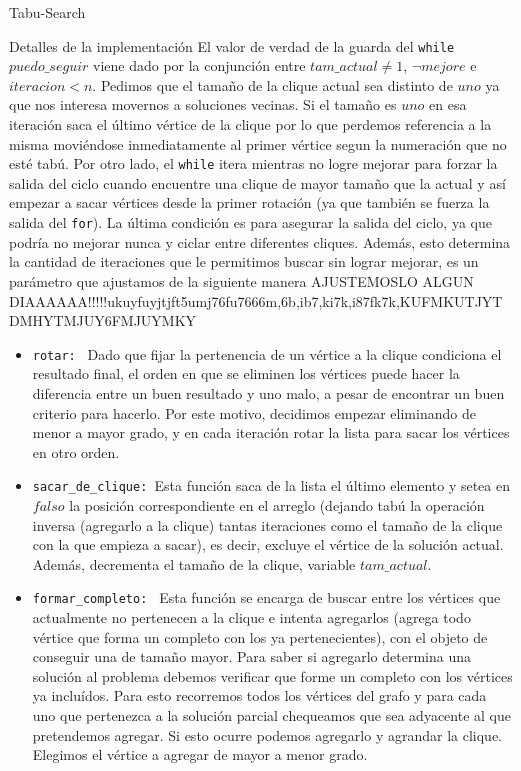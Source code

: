 \begin{section}{Tabu-Search}
\begin{subsection}{Detalles de la implementación}
		El valor de verdad de la guarda del \texttt{while} $puedo\_seguir$ viene dado por la conjunción entre $tam\_actual \neq 1$, $\neg mejore$ e $iteracion<n$.
		Pedimos que el tamaño de la clique actual sea distinto de $uno$ ya que nos interesa movernos a soluciones vecinas. Si el tamaño es $uno$ en esa iteración saca el último vértice de la clique por lo que perdemos referencia a la misma moviéndose inmediatamente al primer vértice segun la numeración que no esté tabú.
		Por otro lado, el \texttt{while} itera mientras no logre mejorar para forzar la salida del ciclo cuando encuentre una clique de mayor tamaño que la actual y así empezar a sacar vértices desde la primer rotación (ya que también se fuerza la salida del \texttt{for}).
		La última condición es para asegurar la salida del ciclo, ya que podría no mejorar nunca y ciclar entre diferentes cliques. Además, esto determina la cantidad de iteraciones que le permitimos buscar sin lograr mejorar, es un parámetro que ajustamos de la siguiente manera AJUSTEMOSLO ALGUN DIAAAAAA!!!!!ukuyfuyjtjft5umj76fu7666m,6b,ib7,ki7k,i87fk7k,KUFMKUTJYTDMHYTMJUY6FMJUYMKY

		\begin{itemize}			
			\item \texttt{rotar: } Dado que fijar la pertenencia de un vértice a la clique condiciona el resultado final, el orden en que se eliminen los vértices puede hacer la diferencia entre un buen resultado y uno malo, a pesar de encontrar un buen criterio para hacerlo. Por este motivo, decidimos empezar eliminando de menor a mayor grado, y en cada iteración rotar la lista para sacar los vértices en otro orden.
			
			\item \texttt{sacar\_de\_clique: }Esta función saca de la lista el último elemento y setea en $falso$ la posición correspondiente en el arreglo (dejando tabú la operación inversa (agregarlo a la clique) tantas iteraciones como el tamaño de la clique con la que empieza a sacar), es decir, excluye el vértice de la solución actual. Además, decrementa el tamaño de la clique, variable $tam\_actual$.
			
			\item \texttt{formar\_completo: } Esta función se encarga de buscar entre los vértices que actualmente no pertenecen a la clique e intenta agregarlos (agrega todo vértice que forma un completo con los ya pertenecientes), con el objeto de conseguir una de tamaño mayor. Para saber si agregarlo determina una solución al problema debemos verificar que forme un completo con los vértices ya incluídos. Para esto recorremos todos los vértices del grafo y para cada uno que pertenezca a la solución parcial chequeamos que sea adyacente al que pretendemos agregar. Si esto ocurre podemos agregarlo y agrandar la clique. Elegimos el vértice a agregar de mayor a menor grado.


\end{itemize}
\end{subsection}
\end{section}
